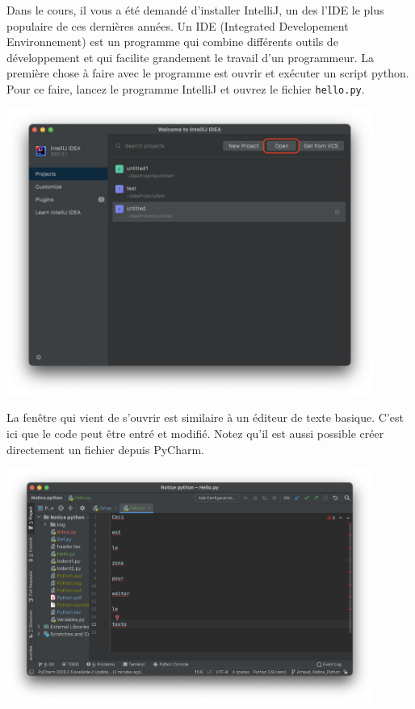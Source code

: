 Dans le cours, il vous a été demandé d'installer IntelliJ, un des l'IDE le plus populaire de ces dernières années. Un IDE (Integrated Developement Environnement) est un programme qui combine différents outils de développement et qui facilite grandement le travail d'un programmeur. La première chose à faire avec le programme est ouvrir et exécuter un script python. Pour ce faire, lancez le programme IntelliJ et ouvrez le fichier \lstinline{hello.py}.
\begin{center}
	\includegraphics[width=12cm]{IntelliJ.png}	
\end{center}

La fenêtre qui vient de s'ouvrir est similaire à un éditeur de texte basique. C'est ici que le code peut être entré et modifié. Notez qu'il est aussi possible créer directement un fichier depuis PyCharm.
\begin{center}
	\includegraphics[width=12cm]{zone.png}	
\end{center}


